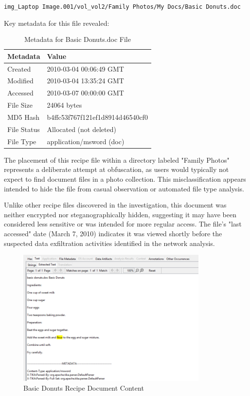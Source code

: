 \begin{verbatim}
img_Laptop Image.001/vol_vol2/Family Photos/My Docs/Basic Donuts.doc
\end{verbatim}

Key metadata for this file revealed:

\begin{table}[htbp]
\centering
\begin{tabular}{|p{3cm}|p{7cm}|}
\hline
\textbf{Metadata} & \textbf{Value} \\
\hline
Created & 2010-03-04 00:06:49 GMT \\
\hline
Modified & 2010-03-04 13:35:24 GMT \\
\hline
Accessed & 2010-03-07 00:00:00 GMT \\
\hline
File Size & 24064 bytes \\
\hline
MD5 Hash & b4ffc53f767f121ef1d8914d46540cf0 \\
\hline
File Status & Allocated (not deleted) \\
\hline
File Type & application/msword (doc) \\
\hline
\end{tabular}
\caption{Metadata for Basic Donuts.doc File}
\label{table:basic_donuts_metadata}
\end{table}

The placement of this recipe file within a directory labeled "Family Photos" represents a deliberate attempt at obfuscation, as users would typically not expect to find document files in a photo collection. This misclassification appears intended to hide the file from casual observation or automated file type analysis.

Unlike other recipe files discovered in the investigation, this document was neither encrypted nor steganographically hidden, suggesting it may have been considered less sensitive or was intended for more regular access. The file's "last accessed" date (March 7, 2010) indicates it was viewed shortly before the suspected data exfiltration activities identified in the network analysis.

\begin{figure}[h]
    \centering
    \includegraphics[width=0.85\textwidth]{images/Artifact and Evidence Recovery/BasicDonuts.png}
    \caption{Basic Donuts Recipe Document Content}
    \label{fig:basic_donuts}
\end{figure}

